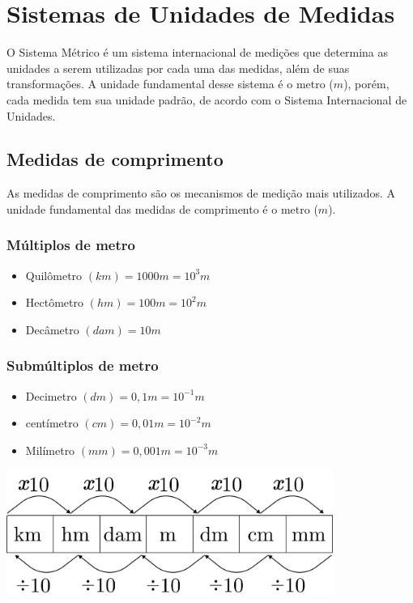 \chapter{Sistemas de Unidades de Medidas}
O Sistema Métrico é um sistema internacional de medições que determina as unidades a serem utilizadas por cada uma das medidas, além de suas transformações. A unidade fundamental desse sistema é o metro ($m$), porém, cada medida tem sua unidade padrão, de acordo com o Sistema Internacional de Unidades.

\section{Medidas de comprimento}
As medidas de comprimento são os mecanismos de medição mais utilizados. A unidade fundamental das medidas de comprimento é o metro ($m$). 
\begin{multicols}{2}
	\subsection{Múltiplos de metro}
		\begin{itemize}
			\item Quilômetro $(km) = 1000m = 10^3m$
			\item Hectômetro $(hm) = 100m = 10^2m$
			\item Decâmetro $(dam) = 10m$ 
			
		\end{itemize}

	\subsection{Submúltiplos de metro}
		\begin{itemize}
			\item Decimetro $(dm) = 0,1m = 10^{-1}m$
			\item centímetro $(cm) = 0,01m = 10^{-2}m$
			\item Milímetro $(mm) = 0,001m = 10^{-3}m$
		\end{itemize}
\columnbreak
     \bigskip
     \noindent   %
     \begin{minipage}{\linewidth}
            \centering 
            \includegraphics[width=0.8\textwidth]{imagens/matematicaBasica/sistemaDeUnidades/MultiplosDeMetro.pdf}
     \end{minipage}
   \end{multicols}


